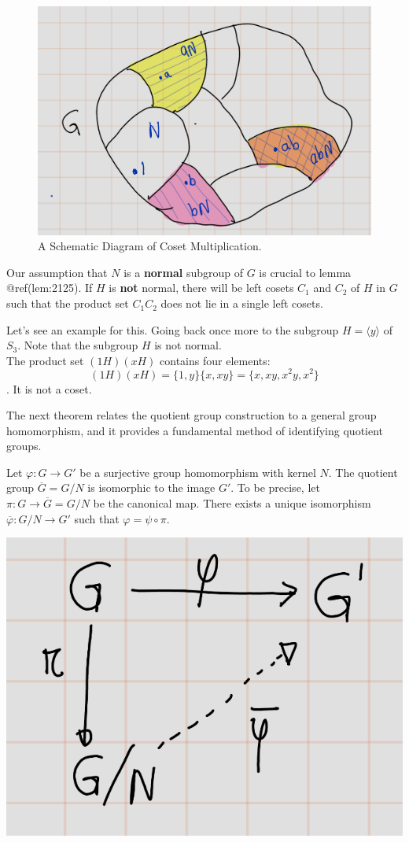\documentclass[
]{book}
\begin{document}
\begin{figure}
\centering
\includegraphics{figures/ch_2/fig30.png}
\caption{A Schematic Diagram of Coset Multiplication.}
\end{figure}

Our assumption that \(N\) is a \textbf{normal} subgroup of \(G\) is
crucial to lemma @ref(lem:2125). If \(H\) is \textbf{not} normal, there
will be left cosets \(C_1\) and \(C_2\) of \(H\) in \(G\) such that the
product set \(C_1 C_2\) does not lie in a single left cosets.

Let's see an example for this. Going back once more to the subgroup
\(H = \langle y \rangle\) of \(S_3\). Note that the subgroup \(H\) is
not normal.\\
The product set \((1H)(xH)\) contains four elements:
\[(1H)(xH)=\{1, y\}\{x, xy\} = \{x, xy, x^2y, x^2\}\]. It is not a
coset.

The next theorem relates the quotient group construction to a general
group homomorphism, and it provides a fundamental method of identifying
quotient groups.

\leavevmode{}%
Let \(\varphi: G \to G'\) be a surjective group homomorphism with kernel
\(N\). The quotient group \(\overline{G}=G/N\) is isomorphic to the
image \(G'\). To be precise, let \(\pi: G \to \overline{G}=G/N\) be the
canonical map. There exists a unique isomorphism
\(\overline{\varphi}: G/N \to G'\) such that
\(\varphi = \psi \circ \pi\).

\begin{center}\includegraphics[width=0.5\linewidth]{figures/ch_2/fig31} \end{center}
\end{document}
